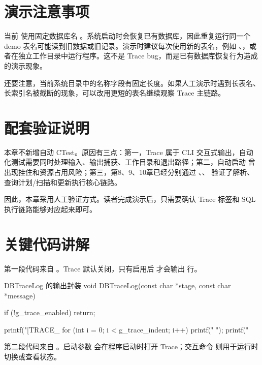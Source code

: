 \section{演示注意事项}
\label{sec:trace-notes}

当前  使用固定数据库名 。系统启动时会恢复已有数据库，因此重复运行同一个 demo 表名可能读到旧数据或旧记录。演示时建议每次使用新的表名，例如 、，或者在独立工作目录中运行程序。这不是 Trace bug，而是已有数据库恢复行为造成的演示现象。

还要注意，当前系统目录中的名称字段有固定长度。如果人工演示时遇到长表名、长索引名被截断的现象，可以改用更短的表名继续观察 Trace 主链路。

\section{配套验证说明}
\label{sec:trace-validation-note}

本章不新增自动 CTest。原因有三点：第一，Trace 属于 CLI 交互式输出，自动化测试需要同时处理输入、输出捕获、工作目录和退出路径；第二，自动启动  曾出现挂住和资源占用风险；第三，第8、9、10章已经分别通过 、、 验证了解析、查询计划/扫描和更新执行核心链路。

因此，本章采用人工验证方式。读者完成演示后，只需要确认 Trace 标签和 SQL 执行链路能够对应起来即可。

\section{关键代码讲解}
\label{sec:trace-code}

第一段代码来自 。Trace 默认关闭，只有启用后  才会输出 \codepath{[TRACE_*]} 行。

\begin{dbcode}{DBTraceLog 的输出封装}
void DBTraceLog(const char *stage, const char *message) {
    if (!g_trace_enabled) {
        return;
    }

    printf("[TRACE_%
    for (int i = 0; i < g_trace_indent; i++) {
        printf("  ");
    }
    printf("%
}
\end{dbcode}

第二段代码来自 。启动参数  会在程序启动时打开 Trace；交互命令  则用于运行时切换或查看状态。

